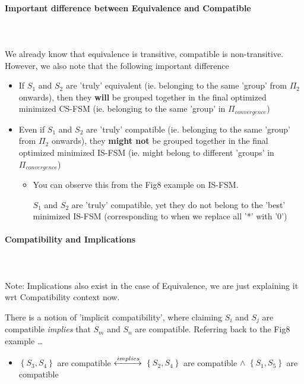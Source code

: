 \documentclass{article}
\begin{document}
\paragraph{Important difference between Equivalence and Compatible}\mbox{}\\\\
We already know that equivalence is transitive, compatible is non-transitive.
However, we also note that the following important difference
\begin{itemize}
    \item If $S_{1}$ and $S_{2}$ are 'truly' equivalent (ie. belonging to the same 'group' from $\Pi_{2}$ onwards), 
          then they \textbf{will} be grouped together in the final optimized minimized CS-FSM (ie. belonging to the same 'group' in $\Pi_{convergence}$)
    \item Even if $S_{1}$ and $S_{2}$ are 'truly' compatible (ie. belonging to the same 'group' from $\Pi_{2}$ onwards), 
          they \textbf{might not} be grouped together in the final optimized minimized IS-FSM (ie. might belong to different 'groups' in $\Pi_{convergence}$)
          \begin{itemize}
            \item You can observe this from the Fig8 example on IS-FSM.
            
                  $S_{1}$ and $S_{2}$ are 'truly' compatible, yet they do not belong to the 'best' minimized IS-FSM (corresponding to when we replace all '*' with '0')
          \end{itemize}
\end{itemize}

\paragraph{Compatibility and Implications}\mbox{}\\\\
Note: Implications also exist in the case of Equivalence, we are just explaining it wrt Compatibility context now.

There is a notion of 'implicit compatibility', where claiming $S_{i}$ and $S_{j}$ are compatible \textit{implies} that $S_{m}$ and $S_{n}$ are compatible.
Referring back to the Fig8 example \dots

\begin{itemize}
    \item $\left\{S_{3},S_{4}\right\}$ are compatible 
          $\xleftrightarrow{implies}$ 
          $\left\{S_{2},S_{4}\right\}$ are compatible
          $\wedge$
          $\left\{S_{1},S_{5}\right\}$ are compatible
\end{itemize}
\end{document}
